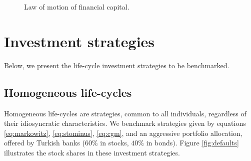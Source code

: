 \begin{figure}[h!]
	\centering
	\caption{Law of motion of financial capital.}
	\label{fig:invdiag}
\end{figure}


\section{Investment strategies}

Below, we present the life-cycle investment strategies to be benchmarked.

\subsection{Homogeneous life-cycles}

Homogeneous life-cycles are strategies, common to all individuals, regardless of their idiosyncratic characteristics. We benchmark strategies given by equations \ref{eq:markowitz}, \ref{eq:stominus}, \ref{eq:cgm}, and an aggressive portfolio allocation, offered by Turkish banks ($60\%$ in stocks, $40\%$ in bonds). Figure \ref{fig:defaults} illustrates the stock shares in these investment strategies.


